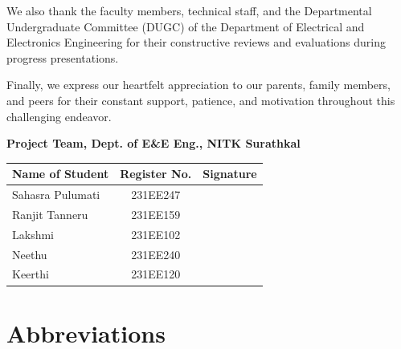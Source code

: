 \documentclass[11pt,a4paper,oneside]{report}
\begin{document}
We also thank the faculty members, technical staff, and the Departmental Undergraduate Committee (DUGC) of the Department of Electrical and Electronics Engineering for their constructive reviews and evaluations during progress presentations.

Finally, we express our heartfelt appreciation to our parents, family members, and peers for their constant support, patience, and motivation throughout this challenging endeavor.

\vspace{1.0cm}
\begin{flushright}
\textbf{Project Team, Dept. of E\&E Eng., NITK Surathkal}
\end{flushright}
\vspace{0.2cm}
\begin{center}
\renewcommand{\arraystretch}{2.0}
\begin{tabular}{|l|c|p{4.6cm}|}
\hline
\textbf{Name of Student} & \textbf{Register No.} & \centering\arraybackslash\textbf{Signature} \\ \hline
Sahasra Pulumati & 231EE247 & \\ \hline
Ranjit Tanneru & 231EE159 & \\ \hline
Lakshmi & 231EE102 & \\ \hline
Neethu & 231EE240 & \\ \hline
Keerthi & 231EE120 & \\ \hline
\end{tabular}
\end{center}

\clearpage
\pagestyle{fancy}
\rhead{}
\tableofcontents
\clearpage

\listoftables
\clearpage

\listoffigures
\clearpage

\chapter*{Abbreviations}
\end{document}
